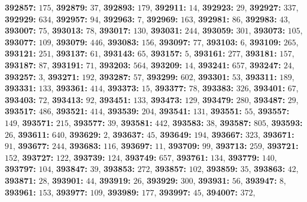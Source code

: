 \textsf{\bfseries 392857:} $175$, \textsf{\bfseries 392879:} $37$, \textsf{\bfseries 392893:} $179$, \textsf{\bfseries 392911:} $14$, \textsf{\bfseries 392923:} $29$, \textsf{\bfseries 392927:} $337$, \textsf{\bfseries 392929:} $634$, \textsf{\bfseries 392957:} $94$, \textsf{\bfseries 392963:} $7$, \textsf{\bfseries 392969:} $163$, \textsf{\bfseries 392981:} $86$, \textsf{\bfseries 392983:} $43$, \textsf{\bfseries 393007:} $75$, \textsf{\bfseries 393013:} $78$, \textsf{\bfseries 393017:} $130$, \textsf{\bfseries 393031:} $244$, \textsf{\bfseries 393059:} $301$, \textsf{\bfseries 393073:} $105$, \textsf{\bfseries 393077:} $109$, \textsf{\bfseries 393079:} $446$, \textsf{\bfseries 393083:} $156$, \textsf{\bfseries 393097:} $77$, \textsf{\bfseries 393103:} $6$, \textsf{\bfseries 393109:} $265$, \textsf{\bfseries 393121:} $251$, \textsf{\bfseries 393137:} $61$, \textsf{\bfseries 393143:} $65$, \textsf{\bfseries 393157:} $5$, \textsf{\bfseries 393161:} $277$, \textsf{\bfseries 393181:} $157$, \textsf{\bfseries 393187:} $87$, \textsf{\bfseries 393191:} $71$, \textsf{\bfseries 393203:} $564$, \textsf{\bfseries 393209:} $14$, \textsf{\bfseries 393241:} $657$, \textsf{\bfseries 393247:} $24$, \textsf{\bfseries 393257:} $3$, \textsf{\bfseries 393271:} $192$, \textsf{\bfseries 393287:} $57$, \textsf{\bfseries 393299:} $602$, \textsf{\bfseries 393301:} $53$, \textsf{\bfseries 393311:} $189$, \textsf{\bfseries 393331:} $133$, \textsf{\bfseries 393361:} $414$, \textsf{\bfseries 393373:} $15$, \textsf{\bfseries 393377:} $78$, \textsf{\bfseries 393383:} $326$, \textsf{\bfseries 393401:} $67$, \textsf{\bfseries 393403:} $72$, \textsf{\bfseries 393413:} $92$, \textsf{\bfseries 393451:} $133$, \textsf{\bfseries 393473:} $129$, \textsf{\bfseries 393479:} $280$, \textsf{\bfseries 393487:} $29$, \textsf{\bfseries 393517:} $486$, \textsf{\bfseries 393521:} $414$, \textsf{\bfseries 393539:} $204$, \textsf{\bfseries 393541:} $131$, \textsf{\bfseries 393551:} $55$, \textsf{\bfseries 393557:} $149$, \textsf{\bfseries 393571:} $215$, \textsf{\bfseries 393577:} $39$, \textsf{\bfseries 393581:} $442$, \textsf{\bfseries 393583:} $38$, \textsf{\bfseries 393587:} $805$, \textsf{\bfseries 393593:} $26$, \textsf{\bfseries 393611:} $640$, \textsf{\bfseries 393629:} $2$, \textsf{\bfseries 393637:} $45$, \textsf{\bfseries 393649:} $194$, \textsf{\bfseries 393667:} $323$, \textsf{\bfseries 393671:} $91$, \textsf{\bfseries 393677:} $244$, \textsf{\bfseries 393683:} $116$, \textsf{\bfseries 393697:} $11$, \textsf{\bfseries 393709:} $99$, \textsf{\bfseries 393713:} $259$, \textsf{\bfseries 393721:} $152$, \textsf{\bfseries 393727:} $122$, \textsf{\bfseries 393739:} $124$, \textsf{\bfseries 393749:} $657$, \textsf{\bfseries 393761:} $134$, \textsf{\bfseries 393779:} $140$, \textsf{\bfseries 393797:} $104$, \textsf{\bfseries 393847:} $39$, \textsf{\bfseries 393853:} $272$, \textsf{\bfseries 393857:} $102$, \textsf{\bfseries 393859:} $35$, \textsf{\bfseries 393863:} $42$, \textsf{\bfseries 393871:} $28$, \textsf{\bfseries 393901:} $44$, \textsf{\bfseries 393919:} $26$, \textsf{\bfseries 393929:} $300$, \textsf{\bfseries 393931:} $56$, \textsf{\bfseries 393947:} $8$, \textsf{\bfseries 393961:} $153$, \textsf{\bfseries 393977:} $109$, \textsf{\bfseries 393989:} $177$, \textsf{\bfseries 393997:} $45$, \textsf{\bfseries 394007:} $372$, 
